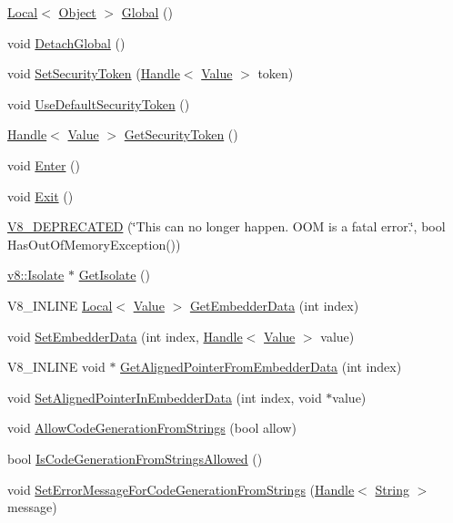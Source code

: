 \begin{DoxyCompactItemize}
\item 
\hyperlink{classv8_1_1_local}{Local}$<$ \hyperlink{classv8_1_1_object}{Object} $>$ \hyperlink{classv8_1_1_context_af5cd9f97ef6a3307c1c21f80f4b743eb}{Global} ()
\item 
void \hyperlink{classv8_1_1_context_a841c7dd92eb8c57df92a268a164dea97}{Detach\+Global} ()
\item 
void \hyperlink{classv8_1_1_context_a288d8549547f6bdf4312f5333f60f24d}{Set\+Security\+Token} (\hyperlink{classv8_1_1_handle}{Handle}$<$ \hyperlink{classv8_1_1_value}{Value} $>$ token)
\item 
void \hyperlink{classv8_1_1_context_aa9e1a14982b64fd51ab87600a287bad2}{Use\+Default\+Security\+Token} ()
\item 
\hyperlink{classv8_1_1_handle}{Handle}$<$ \hyperlink{classv8_1_1_value}{Value} $>$ \hyperlink{classv8_1_1_context_a8e71e658633518ca7718c0f6e938c6a9}{Get\+Security\+Token} ()
\item 
void \hyperlink{classv8_1_1_context_a6995c49d9897eb49053f07874b825133}{Enter} ()
\item 
void \hyperlink{classv8_1_1_context_a2db09d4fefb26023a40d88972a4c1599}{Exit} ()
\item 
\hyperlink{classv8_1_1_context_a6a4ca53837ec39c684cdbfc73ab44e4e}{V8\+\_\+\+D\+E\+P\+R\+E\+C\+A\+T\+E\+D} (\char`\"{}This can no longer happen. O\+O\+M is a fatal error.\char`\"{}, bool Has\+Out\+Of\+Memory\+Exception())
\item 
\hyperlink{classv8_1_1_isolate}{v8\+::\+Isolate} $\ast$ \hyperlink{classv8_1_1_context_af55552d8658ecb20eff7af2c83e8ede2}{Get\+Isolate} ()
\item 
V8\+\_\+\+I\+N\+L\+I\+N\+E \hyperlink{classv8_1_1_local}{Local}$<$ \hyperlink{classv8_1_1_value}{Value} $>$ \hyperlink{classv8_1_1_context_a9cfafe0ac56f6aee17eb80a913489296}{Get\+Embedder\+Data} (int index)
\item 
void \hyperlink{classv8_1_1_context_ae18e007074770872e78e0040f36de8c6}{Set\+Embedder\+Data} (int index, \hyperlink{classv8_1_1_handle}{Handle}$<$ \hyperlink{classv8_1_1_value}{Value} $>$ value)
\item 
V8\+\_\+\+I\+N\+L\+I\+N\+E void $\ast$ \hyperlink{classv8_1_1_context_aa3b5c1a1a5d145c6096840898013f559}{Get\+Aligned\+Pointer\+From\+Embedder\+Data} (int index)
\item 
void \hyperlink{classv8_1_1_context_a522063c88e4c2832f5ff4f3980815f58}{Set\+Aligned\+Pointer\+In\+Embedder\+Data} (int index, void $\ast$value)
\item 
void \hyperlink{classv8_1_1_context_a794ccc42113566f5d363f89c8b0d3c2c}{Allow\+Code\+Generation\+From\+Strings} (bool allow)
\item 
bool \hyperlink{classv8_1_1_context_aa7a960a232d232d1a2a904c2e6c18831}{Is\+Code\+Generation\+From\+Strings\+Allowed} ()
\item 
void \hyperlink{classv8_1_1_context_a6a8d067b246b8792b19e8075bc410f1d}{Set\+Error\+Message\+For\+Code\+Generation\+From\+Strings} (\hyperlink{classv8_1_1_handle}{Handle}$<$ \hyperlink{classv8_1_1_string}{String} $>$ message)
\end{DoxyCompactItemize}
